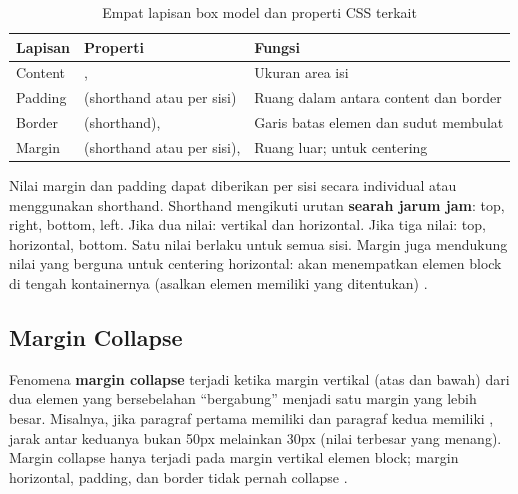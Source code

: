 \begin{table}[H]
\centering
\begin{tabular}{|P{2cm}|P{5cm}|P{5cm}|}
\hline
\textbf{Lapisan} & \textbf{Properti} & \textbf{Fungsi} \\
\hline
Content & ,  & Ukuran area isi \\
\hline
Padding &  (shorthand atau per sisi) & Ruang dalam antara content dan border \\
\hline
Border &  (shorthand),  & Garis batas elemen dan sudut membulat \\
\hline
Margin &  (shorthand atau per sisi),  & Ruang luar;  untuk centering \\
\hline
\end{tabular}
\caption{Empat lapisan box model dan properti CSS terkait}
\end{table}

Nilai margin dan padding dapat diberikan per sisi secara individual atau menggunakan shorthand. Shorthand mengikuti urutan \textbf{searah jarum jam}: top, right, bottom, left. Jika dua nilai: vertikal dan horizontal. Jika tiga nilai: top, horizontal, bottom. Satu nilai berlaku untuk semua sisi. Margin juga mendukung nilai  yang berguna untuk centering horizontal:  akan menempatkan elemen block di tengah kontainernya (asalkan elemen memiliki  yang ditentukan) \cite{webdevCss}.

\subsection{Margin Collapse}

Fenomena \textbf{margin collapse} terjadi ketika margin vertikal (atas dan bawah) dari dua elemen yang bersebelahan ``bergabung'' menjadi satu margin yang lebih besar. Misalnya, jika paragraf pertama memiliki  dan paragraf kedua memiliki , jarak antar keduanya bukan 50px melainkan 30px (nilai terbesar yang menang). Margin collapse hanya terjadi pada margin vertikal elemen block; margin horizontal, padding, dan border tidak pernah collapse \cite{cssTricks}.


